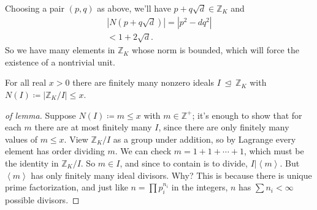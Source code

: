 \begin{remark}

Choosing a pair \((p, q)\) as above, we'll have
\(p + q \sqrt{d} \in {\mathbb{Z}}_K\) and
\begin{align*}
{\left\lvert { N( p + q \sqrt{d} ) } \right\rvert} 
= {\left\lvert { p^2 - d q^2 } \right\rvert} \\
< 1 + 2 \sqrt{d} 
.\end{align*}
So we have many elements in \({\mathbb{Z}}_K\) whose norm is bounded,
which will force the existence of a nontrivial unit.

\end{remark}

\begin{lemma}[?]

For all real \(x> 0\) there are finitely many nonzero ideals
\(I{~\trianglelefteq~}{\mathbb{Z}}_K\) with
\(N(I) \coloneqq{\left\lvert { {\mathbb{Z}}_K/I } \right\rvert} \leq x\).

\end{lemma}

\begin{proof}[of lemma]

Suppose \(N(I) \coloneqq m \leq x\) with \(m \in {\mathbb{Z}}^+\); it's
enough to show that for each \(m\) there are at most finitely many
\(I\), since there are only finitely many values of \(m \leq x\). View
\({\mathbb{Z}}_K / I\) as a group under addition, so by Lagrange every
element has order dividing \(m\). We can check
\(m = 1 + 1 + \cdots + 1\), which must be the identity in
\({\mathbb{Z}}_K/I\). So \(m\in I\), and since to contain is to divide,
\(I \mathrel{\Big|}\left\langle{ m }\right\rangle\). But
\(\left\langle{ m }\right\rangle\) has only finitely many ideal
divisors. Why? This is because there is unique prime factorization, and
just like \(n = \prod p_i^{n_i}\) in the integers, \(n\) has
\(\sum n_i < \infty\) possible divisors.

\end{proof}


